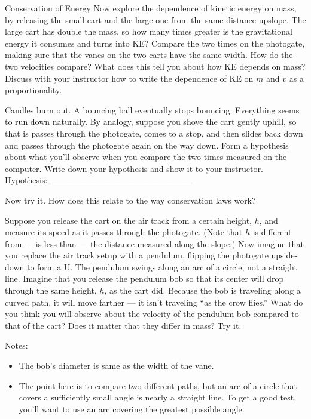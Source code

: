 \begin{lab}{Conservation of Energy}
Now explore the dependence of kinetic energy on mass, by releasing the small
cart and the large one from the same distance upslope. The large cart has
double the mass, so how many times greater is the gravitational energy it consumes and
turns into KE? Compare the two times on the photogate, making sure that
the vanes on the two carts have the same width. How do the two velocities
compare? What does this tell you about how KE depends on mass?
Discuss with your
instructor how to write the dependence of KE on $m$ and $v$ as a proportionality.

Candles burn out. A bouncing ball eventually stops bouncing. Everything seems
to run down naturally. By analogy, suppose you shove the cart gently uphill,
so that is passes through the photogate, comes to a stop, and then slides back
down and passes through the photogate again on the way down. Form a hypothesis
about what you'll observe when you compare the two times measured on the
computer. Write down your hypothesis and show it to your instructor.
Hypothesis: \_\_\_\_\_\_\_\_\_\_\_\_\_\_\_\_\_\_\_\_\_\_\_

Now try it. How does this relate to the way conservation laws work?

\enlargethispage{-\baselineskip}

Suppose you release the cart on the air track from a certain height, $h$, and
measure its speed as it passes through the photogate.
(Note that $h$ is different from --- is less than --- the distance measured along
the slope.) Now imagine that you replace the air track setup with a pendulum,
flipping the photogate upside-down to form a U. The pendulum swings along an
arc of a circle, not a straight line. Imagine that you release the pendulum bob
so that its center will drop through the same height, $h$, as the cart did.
Because the bob is traveling along a curved path, it will move farther --- it
isn't traveling ``as the crow flies.'' What do you think you will observe about
the velocity of the pendulum bob compared to that of the cart? Does it matter
that they differ in mass? Try it.


Notes:
\begin{itemize}
\item[] The bob's diameter is
same as the width of the vane.

\item[] The point here is to compare two different paths, but an arc of
a circle that covers a sufficiently small angle is nearly a straight line.
To get a good test, you'll want to use an arc covering the greatest possible
angle.


\end{itemize}
\end{lab}
